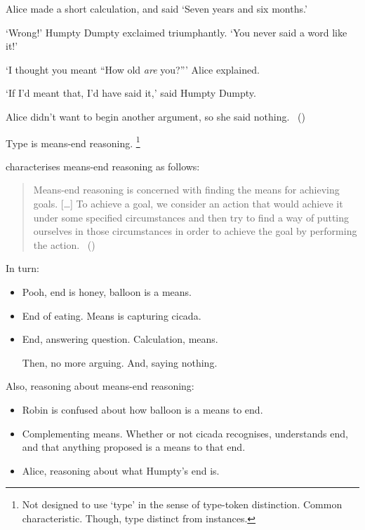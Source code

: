 \begin{note}
\begin{scenario}
    \noindent%
    Alice made a short calculation, and said
    `Seven years and six months.'

    \noindent%
    `Wrong!'
    Humpty Dumpty exclaimed triumphantly.
    `You never said a word like it!'

    \noindent%
    `I thought you meant ``How old \emph{are} you?'''
    Alice explained.

    \noindent%
    `If I'd meant that, I'd have said it,'
    said Humpty Dumpty.

    \noindent%
    Alice didn't want to begin another argument, so she said nothing.\newline
    \mbox{ }\hfill\mbox{(\cite[188]{Carroll:2009aa})}\newline
    \mbox{ }
  \end{scenario}
\end{note}

\begin{note}
  Type is means-end reasoning.%
  \footnote{
    Not designed to use `type' in the sense of type-token distinction.
    Common characteristic.
    Though, type distinct from instances.
  }

  \citeauthor{Pollock:2002aa} characterises means-end reasoning as follows:

  \begin{quote}
    Means-end reasoning is concerned with finding the means for achieving goals.
    [\dots]
    To achieve a goal, we consider an action that would achieve it under some specified circumstances and then try to find a way of putting ourselves in those circumstances in order to achieve the goal by performing the action.%
    \mbox{ }\hfill\mbox{(\cite[60]{Pollock:2002aa})}
  \end{quote}

  In turn:
  \begin{itemize}
  \item
    Pooh, end is honey, balloon is a means.
  \item
    End of eating.
    Means is capturing cicada.
  \item
    End, answering question.
    Calculation, means.

    Then, no more arguing.
    And, saying nothing.
  \end{itemize}
\end{note}

\begin{note}
  Also, reasoning about means-end reasoning:

  \begin{itemize}
  \item
    Robin is confused about how balloon is a means to end.
  \item
    Complementing means.
  Whether or not cicada recognises, understands end, and that anything proposed is a means to that end.
\item
  Alice, reasoning about what Humpty's end is.
  \end{itemize}
\end{note}

